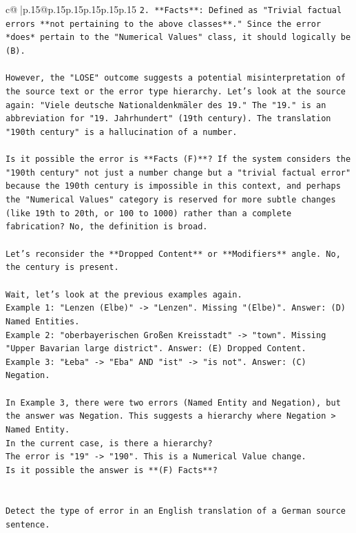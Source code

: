 \documentclass{article}
\begin{document}
{\begin{supertabular}{c@{$\;$}|p{.15\linewidth}@{}p{.15\linewidth}p{.15\linewidth}p{.15\linewidth}p{.15\linewidth}p{.15\linewidth}}
{{{\texttt{2.  **Facts**: Defined as "Trivial factual errors **not pertaining to the above classes**." Since the error *does* pertain to the "Numerical Values" class, it should logically be (B).} \\
\\ 
\texttt{However, the "LOSE" outcome suggests a potential misinterpretation of the source text or the error type hierarchy. Let's look at the source again: "Viele deutsche Nationaldenkmäler des 19." The "19." is an abbreviation for "19. Jahrhundert" (19th century). The translation "190th century" is a hallucination of a number.} \\
\\ 
\texttt{Is it possible the error is **Facts (F)**? If the system considers the "190th century" not just a number change but a "trivial factual error" because the 190th century is impossible in this context, and perhaps the "Numerical Values" category is reserved for more subtle changes (like 19th to 20th, or 100 to 1000) rather than a complete fabrication? No, the definition is broad.} \\
\\ 
\texttt{Let's reconsider the **Dropped Content** or **Modifiers** angle. No, the century is present.} \\
\\ 
\texttt{Wait, let's look at the previous examples again.} \\
\texttt{Example 1: "Lenzen (Elbe)" {-}> "Lenzen". Missing "(Elbe)". Answer: (D) Named Entities.} \\
\texttt{Example 2: "oberbayerischen Großen Kreisstadt" {-}> "town". Missing "Upper Bavarian large district". Answer: (E) Dropped Content.} \\
\texttt{Example 3: "Łeba" {-}> "Eba" AND "ist" {-}> "is not". Answer: (C) Negation.} \\
\\ 
\texttt{In Example 3, there were two errors (Named Entity and Negation), but the answer was Negation. This suggests a hierarchy where Negation > Named Entity.} \\
\texttt{In the current case, is there a hierarchy?} \\
\texttt{The error is "19" {-}> "190". This is a Numerical Value change.} \\
\texttt{Is it possible the answer is **(F) Facts**?} \\
\\ 
\\ 
\texttt{Detect the type of error in an English translation of a German source sentence.} \\
}}}
\end{supertabular}}
\end{document}
